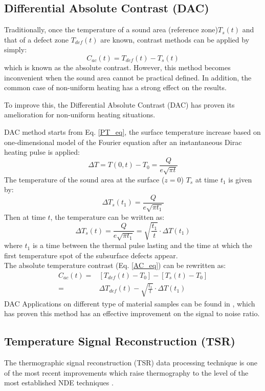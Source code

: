 \subsection{Differential Absolute Contrast (DAC)}
Traditionally, once the temperature of a sound area (reference zone)$T_s(t) $ and that of a defect zone $T_{def}(t) $ are known, contrast methods can be applied by simply:
\begin{equation}
C_{ac}(t) = T_{def}(t) - T_s(t)
\label{AC_eq}
\end{equation}
which is known as the absolute contrast. However, this method becomes inconvenient when the sound area cannot be practical defined. In addition, the common case of non-uniform heating has a strong effect on the results.

To improve this, the Differential Absolute Contrast (DAC) has proven its amelioration for non-uniform heating situations\citep{Benitez2008, pilla2002new}.

DAC method starts from Eq. \ref{PT_eq}, the surface temperature increase based on one-dimensional model of the Fourier equation after an instantaneous Dirac heating pulse is applied:
\begin{equation}
\Delta T = T(0,t) - T_0  = \frac{Q}{e\sqrt{\pi t}}
\label{PT_eq_2}
\end{equation}
The temperature of the sound area at the surface ($z=0$) $T_s$ at time $t_1$ is given by:
\begin{equation}
\Delta T_s(t_1) = \frac{Q}{e\sqrt{\pi t_1}}
\end{equation}
Then at time $t$, the temperature can be written as:
\begin{equation}
\Delta T_s(t) = \frac{Q}{e\sqrt{\pi t_1}} = \sqrt{\frac{t_1}{t}}\cdot \Delta T(t_1)
\end{equation}
where $t_1$ is a time between the thermal pulse lasting and the time at which the first temperature spot of the subsurface defects appear.\\
The absolute temperature contrast (Eq. \ref{AC_eq}) can be rewritten as:
\begin{align}
C_{ac}(t) = & [T_{def}(t) -T_0] - [T_s(t) - T_0] \\ 
		  = & \Delta T_{def}(t) - \sqrt{\frac{t_1}{t}}\cdot \Delta T(t_1)
\end{align}
DAC Applications on different type of material samples can be found in \citep{pilla2002new}, which has proven this method has an effective improvement on the signal to noise ratio.

\subsection{Temperature Signal Reconstruction (TSR)}
The thermographic signal reconstruction (TSR) data processing technique is one of the most recent improvements which raise thermography to the level of the most established NDE techniques \citep{Balageas2015}.

